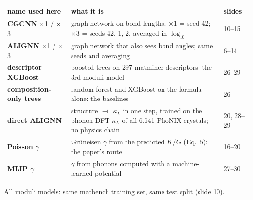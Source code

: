 \documentclass[aspectratio=169]{beamer}
\begin{document}
\begin{frame}

\begin{center}
{\sffamily\scriptsize
\renewcommand{\arraystretch}{1.15}
\begin{tabular}{@{}p{3.1cm}p{8.2cm}l@{}}
\toprule
\textbf{name used here} & \textbf{what it is} & \textbf{slides} \\
\midrule
\textcolor{SlideBlue}{\textbf{CGCNN}} $\times$1 / $\times$3
  & graph network on bond lengths. $\times$1 = seed 42; $\times$3 = seeds 42, 1, 2,
    averaged in $\log_{10}$ & 10--15 \\
\textcolor{SlideGreen}{\textbf{ALIGNN}} $\times$1 / $\times$3
  & graph network that also sees bond angles; same seeds and averaging & 6--14 \\
\textcolor{SlideAmber}{\textbf{descriptor XGBoost}}
  & boosted trees on 297 matminer descriptors; the 3rd moduli model & 26--29 \\
\textcolor{SlideAmber}{\textbf{composition-only trees}}
  & random forest and XGBoost on the formula alone: the baselines & 26 \\
\textcolor{DirectPurple}{\textbf{direct ALIGNN}}
  & structure $\rightarrow$ $\kappa_L$ in one step, trained on the phonon-DFT
    $\kappa_L$ of all 6{,}641 PhoNIX crystals; no physics chain & 20, 28--29 \\
\midrule
\textbf{Poisson $\gamma$}
  & Gr\"uneisen $\gamma$ from the predicted $K/G$ (Eq.~5): the paper's route & 16--20 \\
\textbf{MLIP $\gamma$}
  & $\gamma$ from phonons computed with a machine-learned potential & 27--30 \\
\bottomrule
\end{tabular}}
\end{center}

\vspace{2pt}
{\sffamily\scriptsize
All moduli models: same matbench training set, same test split (slide 10).\par}

\end{frame}
\end{document}
